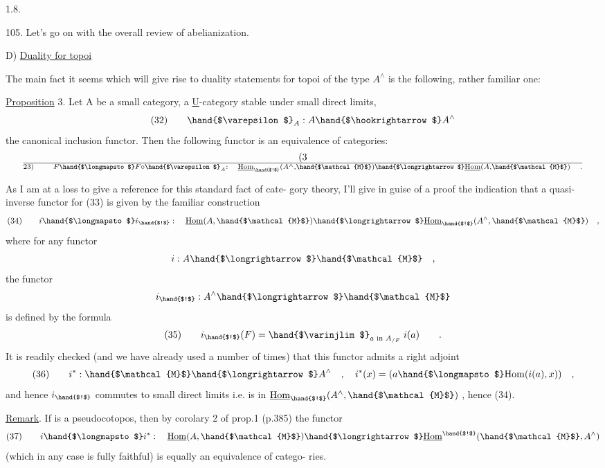 
1.8. 

105.    Let's go on with the overall review of abelianization.

D)  \uline{Duality for topoi} 

The main fact it seems which will give rise to duality statements
for topoi of the type $A^\wedge$ is the following, rather familiar one:

\uline{Proposition} 3.   Let A be a small category,  a \uline{U}-category 
stable under small direct limits,
\[ (32) \qquad \hand{$\varepsilon$}_A : A \hand{$\hookrightarrow$} A^\wedge \]
the canonical inclusion functor.  Then the following functor is an
equivalence of categories:
\[ (3\over{2}{3}) \qquad F \hand{$\longmapsto$} F \circ \hand{$\varepsilon$}_A : \quad \underline{\mathrm{Hom}}_{\hand{$!$}}(A^\wedge,\hand{$\mathcal{M}$}) \hand{$\longrightarrow$} \underline{\mathrm{Hom}}(A,\hand{$\mathcal{M}$}) \quad . \]

As I am at a loss to give a reference for this standard fact of cate-%
gory theory,  I'll give in guise of a proof the indication that a quasi-
inverse functor for (33) is given by the familiar construction
\[ (34) \qquad i \hand{$\longmapsto$} i_{\hand{$!$}} : \quad \underline{\mathrm{Hom}}(A,\hand{$\mathcal{M}$}) \hand{$\longrightarrow$} \underline{\mathrm{Hom}}_{\hand{$!$}}(A^\wedge,\hand{$\mathcal{M}$}) \quad , \]
where for any functor
\[ i: A \hand{$\longrightarrow$} \hand{$\mathcal{M}$} \quad , \]
the functor  \hand{$_!$}
\[ i_{\hand{$!$}}: A^\wedge \hand{$\longrightarrow$} \hand{$\mathcal{M}$} \]
is defined by the formula
\[ (35) \qquad i_{\hand{$!$}}(F) = \hand{$\varinjlim$}_{a \text{ in } A_{/F}} \; i(a) \qquad . \]
It is readily checked (and we have already used a number of times)  that
this functor admits a right adjoint
\[ (36) \qquad i^{*} : \hand{$\mathcal{M}$} \hand{$\longrightarrow$} A^\wedge \quad , \quad i^{*}(x) = ( a \hand{$\longmapsto$} \mathrm{Hom}(i(a),x)) \quad , \]
and hence $i_{\hand{$!$}}$ commutes to small direct limits i.e. is in $\underline{\mathrm{Hom}}_{\hand{$!$}}(A^{\wedge},\hand{$\mathcal{M}$})$ ,
hence (34).

\uline{Remark}. If  is a pseudocotopos,  then by \inserted{(} corolary 2 of prop.1 (p.385)
the functor
\[ (37) \qquad i \hand{$\longmapsto$} i^{*} : \quad \underline{\mathrm{Hom}}(A,\hand{$\mathcal{M}$}) \hand{$\longrightarrow$} \underline{\mathrm{Hom}}^{\hand{$!$}}(\hand{$\mathcal{M}$}, A^\wedge) \]
(which in any case is fully faithful) is equally an equivalence of catego-%
ries.

